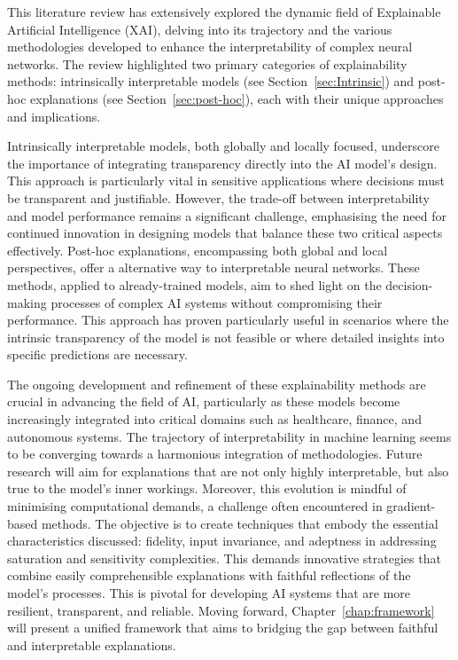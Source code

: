 This literature review has extensively explored the dynamic field of Explainable Artificial Intelligence (XAI), delving into its trajectory and the various methodologies developed to enhance the interpretability of complex neural networks. The review highlighted two primary categories of explainability methods: intrinsically interpretable models (see Section~\ref{sec:Intrinsic}) and post-hoc explanations (see Section~\ref{sec:post-hoc}), each with their unique approaches and implications.

Intrinsically interpretable models, both globally and locally focused, underscore the importance of integrating transparency directly into the AI model's design. This approach is particularly vital in sensitive applications where decisions must be transparent and justifiable. However, the trade-off between interpretability and model performance remains a significant challenge, emphasising the need for continued innovation in designing models that balance these two critical aspects effectively. Post-hoc explanations, encompassing both global and local perspectives, offer a alternative way to interpretable neural networks. These methods, applied to already-trained models, aim to shed light on the decision-making processes of complex AI systems without compromising their performance. This approach has proven particularly useful in scenarios where the intrinsic transparency of the model is not feasible or where detailed insights into specific predictions are necessary.

The ongoing development and refinement of these explainability methods are crucial in advancing the field of AI, particularly as these models become increasingly integrated into critical domains such as healthcare, finance, and autonomous systems. The trajectory of interpretability in machine learning seems to be converging towards a harmonious integration of methodologies. Future research will aim for explanations that are not only highly interpretable, but also true to the model's inner workings. Moreover, this evolution is mindful of minimising computational demands, a challenge often encountered in gradient-based methods. The objective is to create techniques that embody the essential characteristics discussed: fidelity, input invariance, and adeptness in addressing saturation and sensitivity complexities. This demands innovative strategies that combine easily comprehensible explanations with faithful reflections of the model’s processes. This is pivotal for developing AI systems that are more resilient, transparent, and reliable. Moving forward, Chapter~\ref{chap:framework} will present a unified framework that aims to bridging the gap between faithful and interpretable explanations. 
